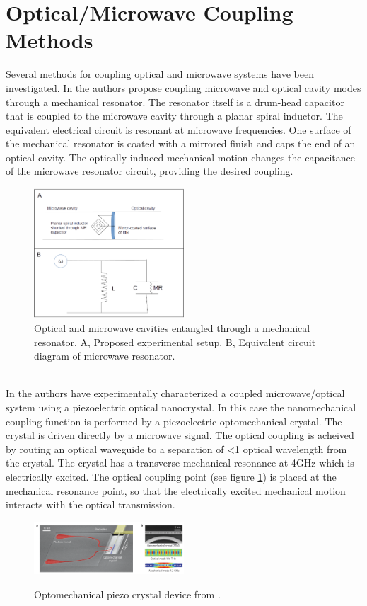 \documentclass[a4paper,10pt,twocolumn]{article}
\numberwithin{equation}{section}
\begin{document}
\section{Optical/Microwave Coupling Methods}
Several methods for coupling optical and microwave systems have been investigated. 
In \cite{nanoMR} the authors propose coupling microwave and optical cavity modes through a mechanical resonator.
The resonator itself is a drum-head capacitor that is coupled to the microwave cavity through a planar spiral inductor. 
The equivalent electrical circuit is resonant at microwave frequencies.
One surface of the mechanical resonator is coated with a mirrored finish and caps the end of an optical cavity.
The optically-induced mechanical motion changes the capacitance of the microwave resonator circuit, providing the desired coupling.
\begin{figure}[ht]
 \caption{Optical and microwave cavities entangled through a mechanical resonator. A, Proposed experimental setup. B, Equivalent circuit diagram of microwave resonator.}
 \centering
   \includegraphics[width=0.5\textwidth]{figs/f1}
\end{figure}
\\In \cite{nanoCrystal} the authors have experimentally characterized a coupled microwave/optical system using a piezoelectric optical nanocrystal.
In this case the nanomechanical coupling function is performed by a piezoelectric optomechanical crystal.
The crystal is driven directly by a microwave signal. 
The optical coupling is acheived by routing an optical waveguide to a separation of <1 optical wavelength from the crystal.
The crystal has a transverse mechanical resonance at 4GHz which is electrically excited.
The optical coupling point (see figure \ref{fig:optoCrystal}) is placed at the mechanical resonance point, so that the electrically excited mechanical motion interacts with the optical transmission.
\begin{figure}[ht]
 \caption{Optomechanical piezo crystal device from \cite{nanoCrystal}.}
 \centering
   \includegraphics[width=0.5\textwidth]{figs/OptoMechCrystal}
 \label{fig:optoCrystal}
\end{figure}
\end{document}
